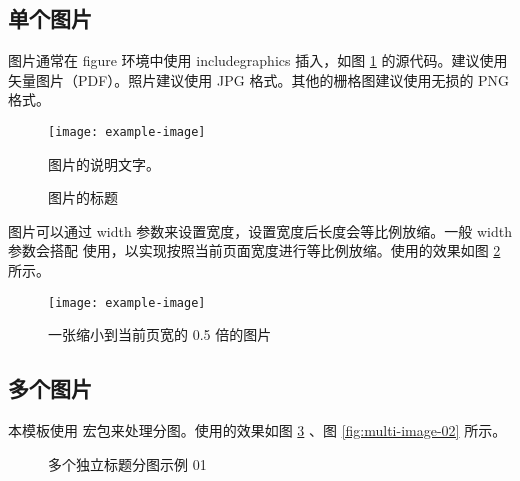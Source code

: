 \documentclass[report,oneside,UTF8,zihao=-4]{config}
\begin{document}
\subsection{单个图片}

图片通常在 figure 环境中使用 includegraphics 插入，如图 \ref{fig:example1} 的源代码。建议使用矢量图片（PDF）。照片建议使用 JPG 格式。其他的栅格图建议使用无损的 PNG 格式。

\begin{figure}[H] %
    \centering %
    \texttt{[image: example-image]} %
    \caption*{图片的说明文字。} %
    \caption{图片的标题} %
    \label{fig:example1} %
\end{figure}

图片可以通过 width 参数来设置宽度，设置宽度后长度会等比例放缩。一般 width 参数会搭配  使用，以实现按照当前页面宽度进行等比例放缩。使用的效果如图 \ref{fig:example2} 所示。

\begin{figure}[H]
    \centering
    \texttt{[image: example-image]}
    \caption{一张缩小到当前页宽的 0.5 倍的图片}
    \label{fig:example2}
\end{figure}



%     

%     


\subsection{多个图片}

本模板使用  宏包来处理分图。使用的效果如图 \ref{fig:multi-image-01} 、图 \ref{fig:multi-image-02} 所示。

\begin{figure}[H]
    \centering
    \caption{多个独立标题分图示例 01}
    \label{fig:multi-image-01}
\end{figure}
\end{document}
